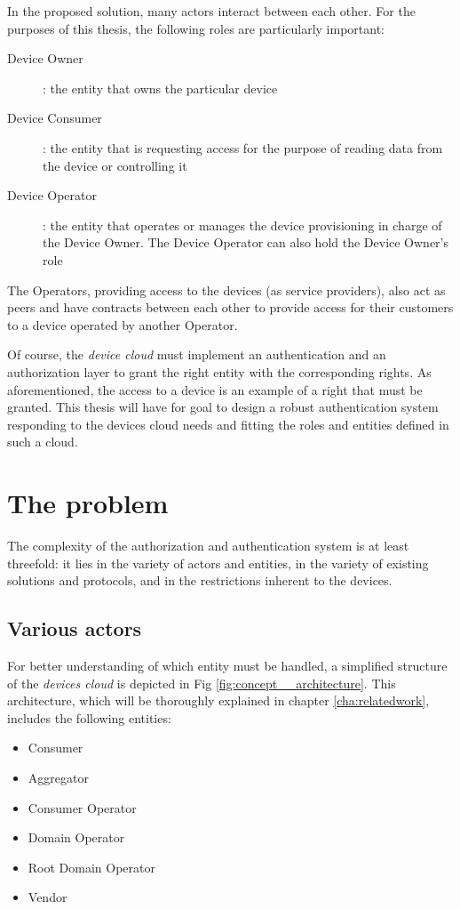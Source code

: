 In the proposed solution, many actors interact between each other. For the purposes of this thesis, the following roles are particularly important:

\begin{description}
	\item[Device Owner]: the entity that owns the particular device
	\item[Device Consumer]: the entity that is requesting access for the purpose of reading data from the device or controlling it
	\item[Device Operator]: the entity that operates or manages the device provisioning in charge of the Device Owner. The Device Operator can also hold the Device Owner's role
\end{description}

The Operators, providing access to the devices (as service providers), also act as peers and have contracts between each other to provide access for their customers to a device operated by another Operator.

Of course, the \emph{device cloud} must implement an authentication and an authorization layer to grant the right entity with the corresponding rights. As aforementioned, the access to a device is an example of a right that must be granted. This thesis will have for goal to design a robust authentication system responding to the devices cloud needs and fitting the roles and entities defined in such a cloud. 


\section{The problem}
The complexity of the authorization and authentication system is at least threefold: it lies in the variety of actors and entities, in the variety of existing solutions and protocols, and in the restrictions inherent to the devices.

\subsection{Various actors} 
For better understanding of which entity must be handled, a simplified structure of the \emph{devices cloud} is depicted in Fig \ref*{fig:concept__architecture}. This architecture, which will be thoroughly explained in chapter \ref{cha:relatedwork}, includes the following entities:
\begin{itemize}
	\item Consumer
	\item Aggregator
	\item Consumer Operator
	\item Domain Operator
	\item Root Domain Operator
	\item Vendor
\end{itemize}

